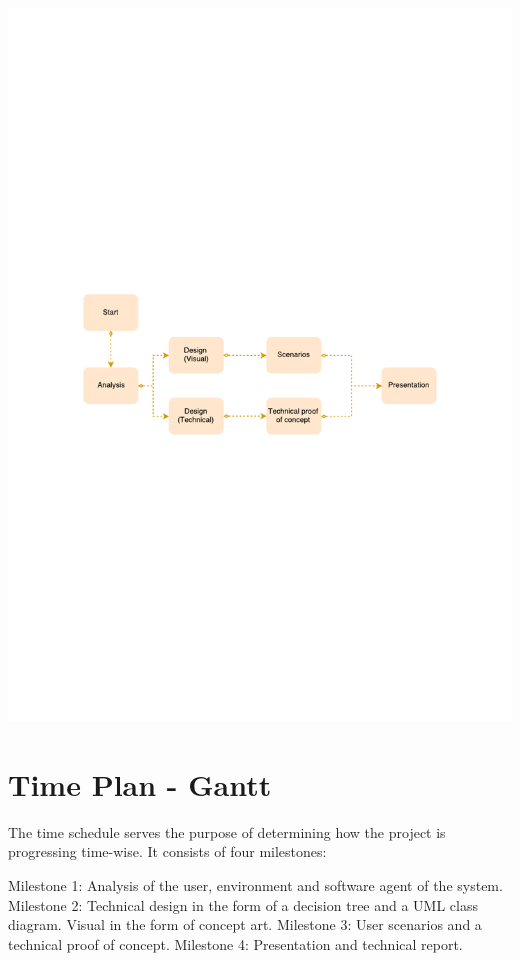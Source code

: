 \documentclass[twoside]{report}
\begin{document}
\includegraphics[width=\linewidth]{graphics/Milestones.pdf} 

\section{Time Plan - Gantt}
The time schedule serves the purpose of determining how the project is
progressing time-wise. It consists of four milestones: 

Milestone 1: Analysis of the user, environment and software agent of the system.
Milestone 2: Technical design in the form of a decision tree and a UML class
diagram. Visual in the form of concept art. Milestone 3: User scenarios and a
technical proof of concept. Milestone 4: Presentation and technical report.
\end{document}

